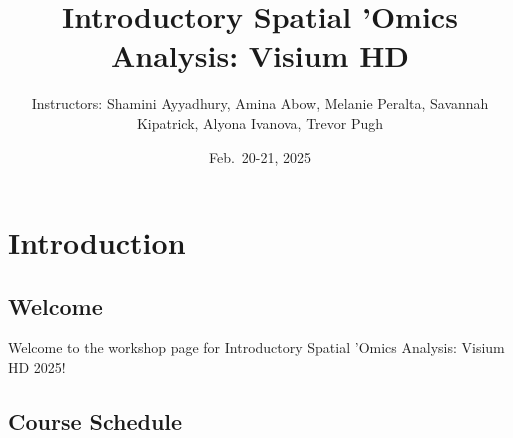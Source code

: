 \documentclass[
]{book}
\title{Introductory Spatial 'Omics Analysis: Visium HD}
\author{Instructors: Shamini Ayyadhury, Amina Abow, Melanie Peralta, Savannah Kipatrick, Alyona Ivanova, Trevor Pugh}
\date{Feb.~20-21, 2025}
\begin{document}
\maketitle

{
\setcounter{tocdepth}{1}
\tableofcontents
}
\hypertarget{part-introduction}{%
\part{Introduction}\label{part-introduction}}

\hypertarget{welcome}{%
\chapter{Welcome}\label{welcome}}

Welcome to the workshop page for Introductory Spatial 'Omics Analysis: Visium HD 2025!

\hypertarget{course-schedule}{%
\chapter{Course Schedule}\label{course-schedule}}
\end{document}
